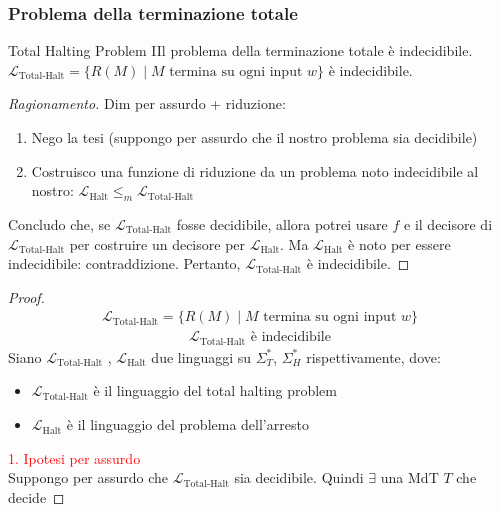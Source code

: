\documentclass{article}  %
\theoremstyle{definition}
\newenvironment{ragionamento}[1][]
  {\begin{proof}[Ragionamento#1]\renewcommand{\qedsymbol}{}\normalfont}
  {\end{proof}}
\begin{document}
\subsubsection{Problema della terminazione totale}
\begin{theorem}{Total Halting Problem}
  IIl problema della terminazione totale è indecidibile. \\
  $\mathcal{L}_{\text{Total-Halt}} = \{R(M) \mid M \text{ termina su ogni input } w\}$ è indecidibile.
  \footnotesize %
  \begin{ragionamento}
    Dim per assurdo + riduzione:
    \begin{enumerate}
      \item Nego la tesi (suppongo per assurdo che il nostro problema sia decidibile)
      \item Costruisco una funzione di riduzione da un problema noto indecidibile al nostro: $\mathcal{L}_{\text{Halt}} \leq_m \mathcal{L}_{\text{Total-Halt}}$
    \end{enumerate}
    Concludo che, se $\mathcal{L}_{\text{Total-Halt}}$ fosse decidibile, allora potrei usare $f$ e il decisore di $\mathcal{L}_{\text{Total-Halt}}$ per
    costruire un decisore per $\mathcal{L}_{\text{Halt}}$. Ma $\mathcal{L}_{\text{Halt}}$ è noto per essere indecidibile: contraddizione. 
    Pertanto, $\mathcal{L}_{\text{Total-Halt}}$ è indecidibile.
  \end{ragionamento}
  \begin{proof}
    \begin{align*}
      \mathcal{L}_{\text{Total-Halt}} = \{R(M) \mid M \text{ termina su ogni input } w\} \tag*{(ipotesi)}
    \end{align*}
    \begin{align*}
      \mathcal{L}_{\text{Total-Halt}} \text{ è indecidibile} \tag*{(tesi)}
    \end{align*}
    Siano $\mathcal{L}_{\text{Total-Halt}}$ , $\mathcal{L}_{\text{Halt}}$ due linguaggi su $\Sigma_T^*$, $\Sigma_H^*$ rispettivamente, dove:
    \begin{itemize}
      \item $\mathcal{L}_{\text{Total-Halt}}$ è il linguaggio del total halting problem
      \item $\mathcal{L}_{\text{Halt}}$ è il linguaggio del problema dell'arresto
    \end{itemize}
    \textcolor{red}{1. Ipotesi per assurdo} \\
    Suppongo per assurdo che $\mathcal{L}_{\text{Total-Halt}}$ sia decidibile. Quindi $\exists$ una MdT $T$ che decide 

\end{proof}
\end{theorem}
\end{document}
